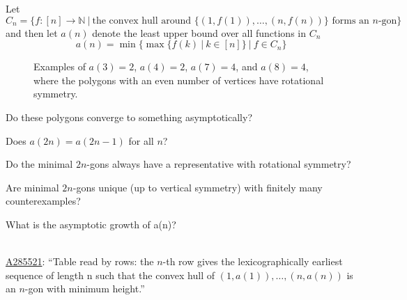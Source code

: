 \documentclass{article}
\begin{document}
Let \[
  C_n = \{f: [n] \rightarrow \mathbb{N}\ |\ \text{the convex hull around } \{(1, f(1)), \hdots, (n, f(n))\} \text{ forms an } n\text{-gon}\}
\] and then let $a(n)$ denote the least upper bound over all functions in $C_n$ \[
  a(n) = \min\{\max\{f(k)\ |\ k \in [n]\}\ |\ f \in C_n\}
\]
\begin{figure}[!h]
  \centering
  \caption{Examples of $a(3) = 2$, $a(4) = 2$, $a(7) = 4$, and $a(8) = 4$, where
    the polygons with an even number of vertices have rotational symmetry.}
\end{figure}

\begin{question}
  Do these polygons converge to something asymptotically?
\end{question}

\begin{related}
  \item Does $a(2n) = a(2n - 1)$ for all $n$?
  \item Do the minimal $2n$-gons always have a representative with rotational
    symmetry?
  \item Are minimal $2n$-gons unique (up to vertical symmetry) with finitely
    many counterexamples?
  \item What is the asymptotic growth of a(n)?
\end{related}

\begin{references} \text{} \\
  \href{https://oeis.org/A285521}{A285521}: ``Table read by rows: the $n$-th row gives the lexicographically earliest sequence of length n such that the convex hull of $(1, a(1)), \dots, (n, a(n))$ is an $n$-gon with minimum height.''
\end{references}
\end{document}
